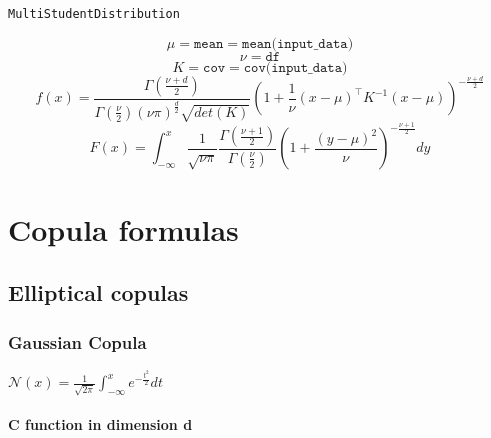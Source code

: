 \documentclass{article}
\begin{document}
  	\texttt{MultiStudentDistribution}
  	
  	\begin{equation*}
  	\mu = \texttt{mean} = \texttt{mean(input\_data)}
  	\end{equation*}
  	\begin{equation*}
  	\nu = \texttt{df}
  	\end{equation*}
  	\begin{equation*}
  	K = \texttt{cov} = \texttt{cov(input\_data)}
  	\end{equation*}
  	\begin{equation*}
  	f(x) = \frac{\Gamma (\frac{\nu +d}{2})}{\Gamma
	 (\frac{\nu}{2})(\nu \pi)^{\frac{d}{2}}\sqrt{det(K)}}\left(1+\frac{1}{\nu}(x-\mu)^\top K^{-1} (x-\mu) \right)^{-\frac{\nu +d}{2}}
  	\end{equation*}
  	\begin{equation*}
  	F(x) = \int_{-\infty}^x \frac{1}{\sqrt{\nu\pi}}\frac{\Gamma(\frac{\nu+1}{2})}{\Gamma(\frac{\nu}{2})}\left(1+\frac{(y-\mu)^2}{\nu}\right)^{-\frac{\nu+1}{2}}dy
  	\end{equation*}
	
	\section{Copula formulas}
	\label{sec:copulas}	
	\subsection{Elliptical copulas}
	\subsubsection{Gaussian Copula}
	
\begin{math} \mathcal{N}(x)=\frac{1}{\sqrt{2\pi}}\int_{-\infty}^{x} e^{-\frac{t^{2}}{2}}dt \end{math}
	
	\paragraph{C function in dimension d}
	
\end{document}
